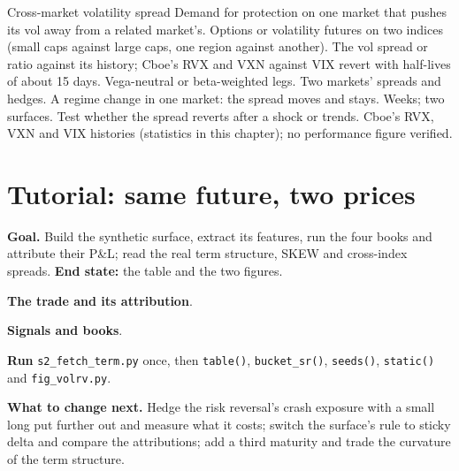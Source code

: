 \begin{strategyfile}{Cross-market volatility spread}\label{strat:s2:skew-and-term-structure-relative-value:cross}
 Demand for protection on one market that pushes its vol away from a related market's.
 Options or volatility futures on two indices (small caps against large caps, one region against another).
 The vol spread or ratio against its history; Cboe's RVX and VXN against VIX revert with half-lives of about 15 days.
 Vega-neutral or beta-weighted legs.
 Two markets' spreads and hedges.
 A regime change in one market: the spread moves and stays.
 Weeks; two surfaces.
 Test whether the spread reverts after a shock or trends.
 Cboe's RVX, VXN and VIX histories (statistics in this chapter); no performance figure verified.
\end{strategyfile}

\section{Tutorial: same future, two prices}\label{tut:s2:skew-and-term-structure-relative-value:tut}

\begin{tutorial}
\textbf{Goal.} Build the synthetic surface, extract its features, run the four books and attribute their P\&L; read the real term structure, SKEW and
cross-index spreads. \textbf{End state:} the table and the two figures.
\begin{tutsteps}
\item \textbf{The trade and its attribution}.
\label{lst:s2:skew-and-term-structure-relative-value:pnl}
\item \textbf{Signals and books}.
\label{lst:s2:skew-and-term-structure-relative-value:books}
\item \textbf{Run} \texttt{s2\_fetch\_term.py} once, then \texttt{table()}, \texttt{bucket\_sr()}, \texttt{seeds()}, \texttt{static()} and
\texttt{fig\_volrv.py}.
\end{tutsteps}
\textbf{What to change next.} Hedge the risk reversal's crash exposure with a small long put further out and measure what it costs; switch the
surface's rule to sticky delta and compare the attributions; add a third maturity and trade the curvature of the term structure.
\end{tutorial}

